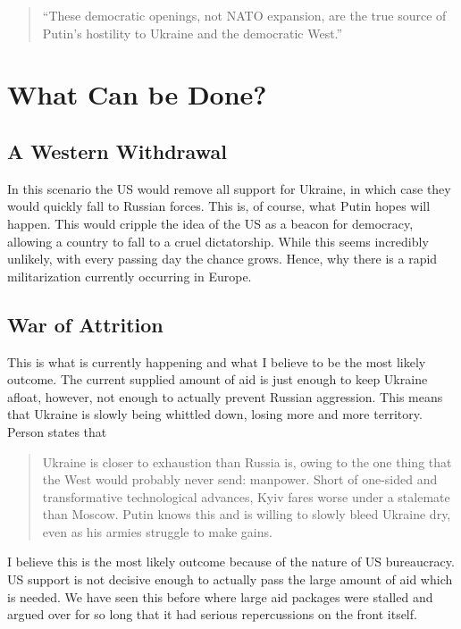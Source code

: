 \documentclass{article}
\begin{document}
    \begin{quote}
        ``These democratic openings, not NATO expansion, are the true source of Putin's hostility to Ukraine and the democratic West.''
    \end{quote}

\section{What Can be Done?}
    
    \subsection{A Western Withdrawal}
        In this scenario the US would remove all support for Ukraine, in which case they would quickly fall to Russian forces. This is, of course, what Putin hopes will happen. This would cripple the idea of the US as a beacon for democracy, allowing a country to fall to a cruel dictatorship. While this seems incredibly unlikely, with every passing day the chance grows. Hence, why there is a rapid militarization currently occurring in Europe.

    \subsection{War of Attrition}
        This is what is currently happening and what I believe to be the most likely outcome. The current supplied amount of aid is just enough to keep Ukraine afloat, however, not enough to actually prevent Russian aggression. This means that Ukraine is slowly being whittled down, losing more and more territory. Person states that
        
        \begin{quote}
            Ukraine is closer to exhaustion than Russia is, owing to the one thing that the West would probably never send: manpower. Short of one-sided and transformative technological advances, Kyiv fares worse under a stalemate than Moscow. Putin knows this and is willing to slowly bleed Ukraine dry, even as his armies struggle to make gains.
        \end{quote}

        I believe this is the most likely outcome because of the nature of US bureaucracy. US support is not decisive enough to actually pass the large amount of aid which is needed. We have seen this before where large aid packages were stalled and argued over for so long that it had serious repercussions on the front itself.
\end{document}
